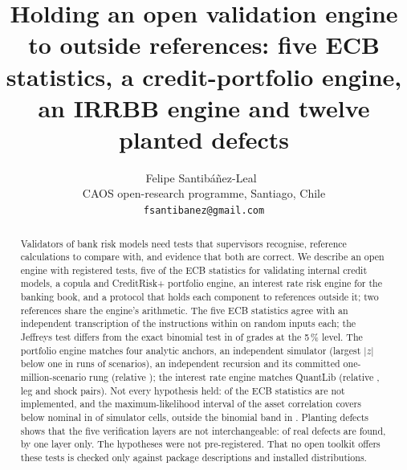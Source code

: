 \documentclass[11pt]{article}
\title{Holding an open validation engine to outside references: five ECB statistics, a credit-portfolio engine, an IRRBB engine and twelve planted defects}
\author{Felipe Santib\'a\~nez-Leal~\orcidlink{0000-0002-0150-3246}\\
\small CAOS open-research programme, Santiago, Chile\\
\small \texttt{fsantibanez@gmail.com}}
\date{\docdate}
\begin{document}
\maketitle
\headerblock

\begin{abstract}
Validators of bank risk models need tests that supervisors recognise, reference calculations to compare with, and evidence that both are correct.
We describe an open engine with \testsTotal{} registered tests, five of the \ecbSections{} ECB statistics for validating internal credit models, a copula and CreditRisk+ portfolio engine, an interest rate risk engine for the banking book, and a protocol that holds each component to references outside it; two references share the engine's arithmetic.
The five ECB statistics agree with an independent transcription of the instructions within \ecbAllMax{} on \ecbInputs{} random inputs each; the Jeffreys test differs from the exact binomial test in \disagreeFive{} of \cCells{} grades at the 5\,\% level.
The portfolio engine matches four analytic anchors, an independent simulator (largest $|z|$ below one in \mcReps{} runs of \mcScen{} scenarios), an independent recursion and its committed one-million-scenario rung (relative \regenRel{}); the interest rate engine matches QuantLib (relative \irrQlMax{}, \irrLegs{} leg and shock pairs).
Not every hypothesis held: \ecbAbsent{} of the \ecbSections{} ECB statistics are not implemented, and the maximum-likelihood interval of the asset correlation covers below nominal in \gridMlBelow{} of \gridMlCells{} simulator cells, outside the binomial band in \gridMlFail{}.
Planting \ablMutants{} defects shows that the five verification layers are not interchangeable: \ablAny{} of \ablReal{} real defects are found, \ablOnly{} by one layer only.
The hypotheses were not pre-registered.
That no open toolkit offers these tests is checked only against \pypiFound{} package descriptions and \distScanned{} installed distributions.
\end{abstract}
















\end{document}
